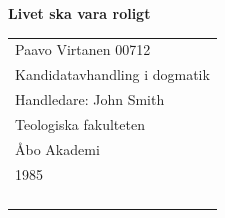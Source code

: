 \documentclass[a4paper,12pt]{book}
\begin{document}
\pagestyle{empty}    
\begingroup
{}


\begin{titlepage}
\vspace*{144pt}
\begin{center}
\Huge\bf Livet ska vara roligt %
\end{center}
\enlargethispage{3cm}
\vfill

\hfill
\begin{tabular}[t]{l@{}}%
Paavo Virtanen 00712\\ %
Kandidatavhandling i dogmatik\\ %
Handledare: John Smith\\ %
Teologiska fakulteten\\ %
Åbo Akademi\\ 
1985\\ %
\\
\\
\\
\\
\end{tabular}
\end{titlepage}


\tableofcontents 

\endgroup %

\clearpage
\pagestyle{plain}      


 

 

 

\printbibliography[title={Källförteckning}] %
\end{document}
